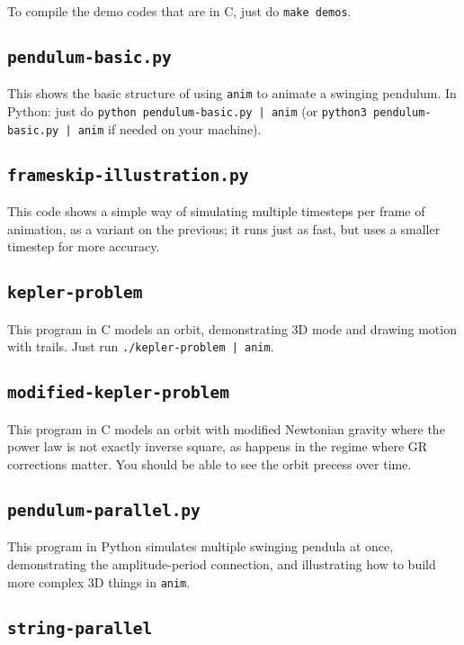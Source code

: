 \documentclass[12pt]{article}
\begin{document}
To compile the demo codes that are in C, just do {\tt make demos}.

\subsection{\tt pendulum-basic.py}

This shows the basic structure of using {\tt anim} to animate a swinging pendulum. 
In Python: just do {\tt python pendulum-basic.py | anim} (or {\tt python3 pendulum-basic.py | anim} if
needed on your machine).

\subsection{\tt frameskip-illustration.py}

This code shows a simple way of simulating multiple timesteps per frame of animation,
as a variant on the previous; it runs just as fast, but uses a smaller timestep for
more accuracy.

\subsection{\tt kepler-problem}

This program in C models an orbit, demonstrating 3D mode and drawing motion with 
trails. Just run {\tt ./kepler-problem | anim}.

\subsection{\tt modified-kepler-problem}

This program in C models an orbit with modified Newtonian gravity where the power law
is not exactly inverse square, as happens in the regime where GR corrections matter.
You should be able to see the orbit precess over time.

\subsection{\tt pendulum-parallel.py}

This program in Python simulates multiple swinging pendula at once, demonstrating
the amplitude-period connection, and illustrating how to build more complex 3D
things in {\tt anim}.

\subsection{\tt string-parallel}
\end{document}
